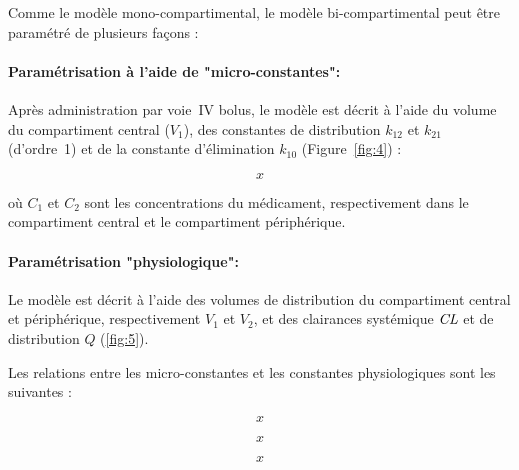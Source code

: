 Comme le modèle mono-compartimental, le modèle bi-compartimental peut être paramétré de plusieurs façons :

\paragraph*{Paramétrisation à l'aide de "micro-constantes":} Après administration par voie~IV bolus, le modèle est décrit à l'aide du volume du compartiment central ($V_1$), des constantes de distribution $k_{12}$ et $k_{21}$ (d'ordre~1) et de la constante d'élimination $k_{10}$ (Figure~\ref{fig:4}) :

\begin{equation}
x
\label{eq:24}
\end{equation}

où $C_1$ et $C_2$ sont les concentrations du médicament, respectivement dans le compartiment central et le compartiment périphérique.

\paragraph*{Paramétrisation "physiologique":} Le modèle est décrit à l'aide des volumes de distribution du compartiment central et périphérique, respectivement $V_1$ et $V_2$, et des clairances systémique $\operatorname{\textit{CL}}$ et de distribution $Q$ (\ref{fig:5}). 

Les relations entre les micro-constantes et les constantes physiologiques sont les suivantes :

\begin{equation}
x
\label{eq:25}
\end{equation}

\begin{equation}
x
\label{eq:26}
\end{equation}

\begin{equation}
x
\label{eq:27}
\end{equation}

